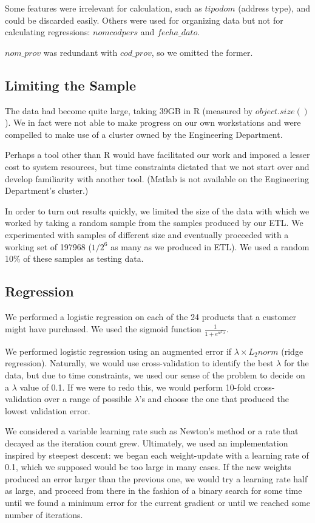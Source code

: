 \documentclass{report}
\begin{document}
Some features were irrelevant for calculation, such as $tipodom$ (address type), and could be discarded easily. Others were used for organizing data but not for calculating regressions: $nomcodpers$ and $fecha\_dato$.

$nom\_prov$ was redundant with $cod\_prov$, so we omitted the former.

\subsection{Limiting the Sample}

The data had become quite large, taking 39GB in R (measured by $object.size()$). We in fact were not able to make progress on our own workstations and were compelled to make use of a cluster owned by the Engineering Department.

Perhaps a tool other than R would have facilitated our work and imposed a lesser cost to system resources, but time constraints dictated that we not start over and develop familiarity with another tool. (Matlab is not available on the Engineering Department's cluster.)

In order to turn out results quickly, we limited the size of the data with which we worked by taking a random sample from the samples produced by our ETL. We experimented with samples of different size and eventually proceeded with a working set of 197968 ($1/2^6$ as many as we produced in ETL). We used a random 10\% of these samples as testing data.

\subsection{Regression}

We performed a logistic regression on each of the 24 products that a customer might have purchased. We used the sigmoid function $\frac{1}{1+e^{w^Tx}}$.

We performed logistic regression using an augmented error if $\lambda \times L_2norm$ (ridge regression). Naturally, we would use cross-validation to identify the best $\lambda$ for the data, but due to time constraints, we used our sense of the problem to decide on a $\lambda$ value of 0.1. If we were to redo this, we would perform 10-fold cross-validation over a range of possible $\lambda$'s and choose the one that produced the lowest validation error.

We considered a variable learning rate such as Newton's method or a rate that decayed as the iteration count grew. Ultimately, we used an implementation inspired by steepest descent: we began each weight-update with a learning rate of 0.1, which we supposed would be too large in many cases. If the new weights produced an error larger than the previous one, we would try a learning rate half as large, and proceed from there in the fashion of a binary search for some time until we found a minimum error for the current gradient or until we reached some number of iterations.
\end{document}
